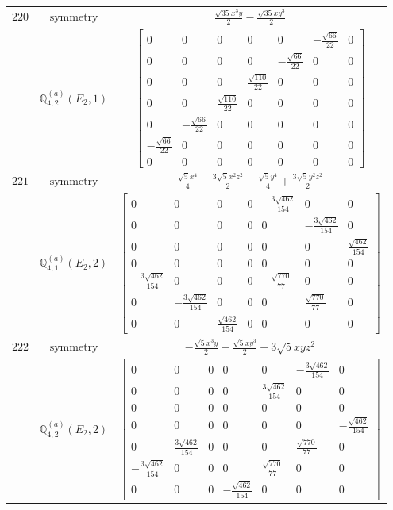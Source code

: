 \documentclass[fleqn,8pt,landscape]{jsarticle}
\begin{document}
\begin{longtable}{ccc}
$ 220 $ & $ \text{symmetry} $ & $ \frac{\sqrt{35} x^{3} y}{2} - \frac{\sqrt{35} x y^{3}}{2} $ \\
$  $ & $ \mathbb{Q}_{4,2}^{(a)}(E_{2},1) $ & $ \begin{bmatrix} 0 & 0 & 0 & 0 & 0 & - \frac{\sqrt{66}}{22} & 0 \\ 0 & 0 & 0 & 0 & - \frac{\sqrt{66}}{22} & 0 & 0 \\ 0 & 0 & 0 & \frac{\sqrt{110}}{22} & 0 & 0 & 0 \\ 0 & 0 & \frac{\sqrt{110}}{22} & 0 & 0 & 0 & 0 \\ 0 & - \frac{\sqrt{66}}{22} & 0 & 0 & 0 & 0 & 0 \\ - \frac{\sqrt{66}}{22} & 0 & 0 & 0 & 0 & 0 & 0 \\ 0 & 0 & 0 & 0 & 0 & 0 & 0 \end{bmatrix} $ \\ \hline
$ 221 $ & $ \text{symmetry} $ & $ \frac{\sqrt{5} x^{4}}{4} - \frac{3 \sqrt{5} x^{2} z^{2}}{2} - \frac{\sqrt{5} y^{4}}{4} + \frac{3 \sqrt{5} y^{2} z^{2}}{2} $ \\
$  $ & $ \mathbb{Q}_{4,1}^{(a)}(E_{2},2) $ & $ \begin{bmatrix} 0 & 0 & 0 & 0 & - \frac{3 \sqrt{462}}{154} & 0 & 0 \\ 0 & 0 & 0 & 0 & 0 & - \frac{3 \sqrt{462}}{154} & 0 \\ 0 & 0 & 0 & 0 & 0 & 0 & \frac{\sqrt{462}}{154} \\ 0 & 0 & 0 & 0 & 0 & 0 & 0 \\ - \frac{3 \sqrt{462}}{154} & 0 & 0 & 0 & - \frac{\sqrt{770}}{77} & 0 & 0 \\ 0 & - \frac{3 \sqrt{462}}{154} & 0 & 0 & 0 & \frac{\sqrt{770}}{77} & 0 \\ 0 & 0 & \frac{\sqrt{462}}{154} & 0 & 0 & 0 & 0 \end{bmatrix} $ \\ \hline
$ 222 $ & $ \text{symmetry} $ & $ - \frac{\sqrt{5} x^{3} y}{2} - \frac{\sqrt{5} x y^{3}}{2} + 3 \sqrt{5} x y z^{2} $ \\
$  $ & $ \mathbb{Q}_{4,2}^{(a)}(E_{2},2) $ & $ \begin{bmatrix} 0 & 0 & 0 & 0 & 0 & - \frac{3 \sqrt{462}}{154} & 0 \\ 0 & 0 & 0 & 0 & \frac{3 \sqrt{462}}{154} & 0 & 0 \\ 0 & 0 & 0 & 0 & 0 & 0 & 0 \\ 0 & 0 & 0 & 0 & 0 & 0 & - \frac{\sqrt{462}}{154} \\ 0 & \frac{3 \sqrt{462}}{154} & 0 & 0 & 0 & \frac{\sqrt{770}}{77} & 0 \\ - \frac{3 \sqrt{462}}{154} & 0 & 0 & 0 & \frac{\sqrt{770}}{77} & 0 & 0 \\ 0 & 0 & 0 & - \frac{\sqrt{462}}{154} & 0 & 0 & 0 \end{bmatrix} $ \\ \hline

\end{longtable}
\end{document}
